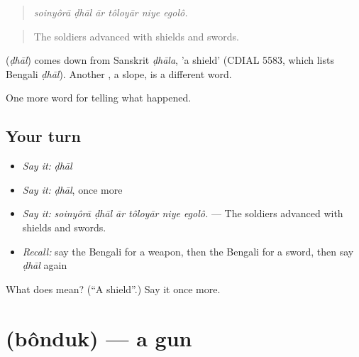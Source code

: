 \begin{quote}
     
\end{quote}

\begin{quote}
\emph{soinyôrā ḍhāl ār tôloyār niye egolô.}
\end{quote}

\begin{quote}
The soldiers advanced with shields and swords.
\end{quote}

\begin{cousinweb}
\textbf{} (\emph{ḍhāl}) comes down from Sanskrit \emph{ḍhāla}, 'a shield' (CDIAL 5583, which lists Bengali \emph{ḍhāl}). Another , a slope, is a different word.
\end{cousinweb}

\begin{grammarlens}[title={What you've built}]
One more word for telling what happened.
\end{grammarlens}

\subsection*{Your turn}
\begin{itemize}
\raggedright
  \item \emph{Say it:} \emph{ḍhāl}
  \item \emph{Say it:} \emph{ḍhāl}, once more
  \item \emph{Say it:} \emph{soinyôrā ḍhāl ār tôloyār niye egolô.} — The soldiers advanced with shields and swords.
  \item \emph{Recall:} say the Bengali for a weapon, then the Bengali for a sword, then say \emph{ḍhāl} again
\end{itemize}

\begin{tcolorbox}[breakable,colback=teal!4,colframe=teal!35!black,title={Before you move on}]
What does  mean? (\textquotedblleft{}A shield\textquotedblright{}.) Say it once more.
\end{tcolorbox}
\section[\texorpdfstring{\bn{বন্দুক} (bônduk)}{বন্দুক (bônduk)}]{ (bônduk) — a gun}

\label{lesson:BN-C315-bonduk}



